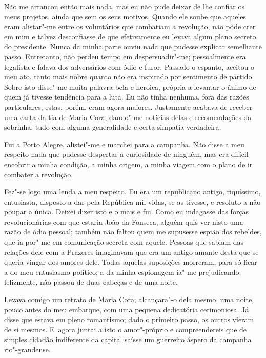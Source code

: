 \begin{linenumbers}
Não me arrancou então mais nada, mas eu não pude deixar de lhe confiar
os meus projetos, ainda que sem os seus motivos. Quando ele soube que
aqueles eram alistar"-me entre os voluntários que combatiam a revolução,
não pôde crer em mim e talvez desconfiasse de que efetivamente eu levava
algum plano secreto do presidente. Nunca da minha parte ouviu nada que
pudesse explicar semelhante passo. Entretanto, não perdeu tempo em
despersuadir"-me; pessoalmente era legalista e falava dos adversários com
ódio e furor. Passado o espanto, aceitou o meu ato, tanto mais nobre
quanto não era inspirado por sentimento de partido. Sobre isto disse"-me
muita palavra bela e heroica, própria a levantar o ânimo de quem já
tivesse tendência para a luta. Eu não tinha nenhuma, fora das razões
particulares; estas, porém, eram agora maiores. Justamente acabava de
receber uma carta da tia de Maria Cora, dando"-me notícias delas e
recomendações da sobrinha, tudo com alguma generalidade e certa simpatia
verdadeira.

Fui a Porto Alegre, alistei"-me e marchei para a campanha. Não disse a
meu respeito nada que pudesse despertar a curiosidade de ninguém, mas
era difícil encobrir a minha condição, a minha origem, a minha viagem
com o plano de ir combater a revolução.

Fez"-se logo uma lenda a meu respeito. Eu era um republicano antigo,
riquíssimo, entusiasta, disposto a dar pela República mil vidas, se as
tivesse, e resoluto a não poupar a única. Deixei dizer isto e o mais e
fui. Como eu indagasse das forças revolucionárias com que estaria João
da Fonseca, alguém quis ver nisto uma razão de ódio pessoal; também não
faltou quem me supusesse espião dos rebeldes, que ia por"-me em
comunicação secreta com aquele. Pessoas que sabiam das relações dele com
a Prazeres imaginavam que era um antigo amante desta que se queria
vingar dos amores dele. Todas aquelas suposições morreram, para só ficar
a do meu entusiasmo político; a da minha espionagem ia"-me prejudicando;
felizmente, não passou de duas cabeças e de uma noite.

Levava comigo um retrato de Maria Cora; alcançara"-o dela mesmo, uma
noite, pouco antes do meu embarque, com uma pequena dedicatória
cerimoniosa. Já disse que estava em pleno romantismo; dado o primeiro
passo, os outros vieram de si mesmos. E~agora juntai a isto o
amor"-próprio e compreendereis que de simples cidadão indiferente da
capital saísse um guerreiro áspero da campanha rio"-grandense.


\end{linenumbers}
